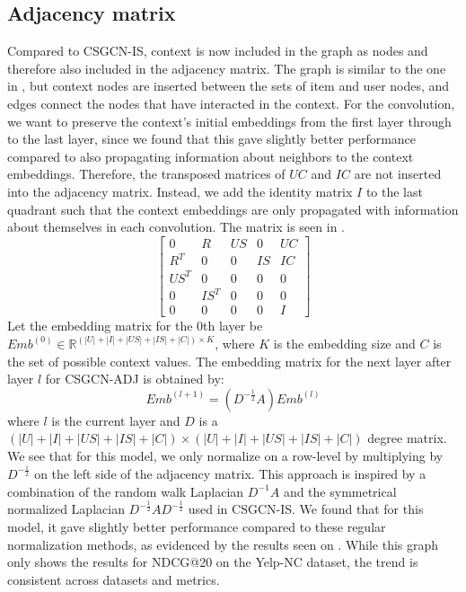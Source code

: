 \subsection{Adjacency matrix}\label{subsec:csgcn_adj_adj_mat}
Compared to CSGCN-IS, context is now included in the graph as nodes and therefore also included in the adjacency matrix.
The graph is similar to the one in , but context nodes are inserted between the sets of item and user nodes, and edges connect the nodes that have interacted in the context.
For the convolution, we want to preserve the context's initial embeddings from the first layer through to the last layer, since we found that this gave slightly better performance compared to also propagating information about neighbors to the context embeddings.
Therefore, the transposed matrices of $UC$ and $IC$ are not inserted into the adjacency matrix.
Instead, we add the identity matrix $I$ to the last quadrant such that the context embeddings are only propagated with information about themselves in each convolution.
The matrix is seen in .
\begin{equation}\label{csgcn_adj_adj_mat}
    \begin{bmatrix}
    0 & R & US & 0 & UC\\
    R^T & 0 & 0 & IS & IC\\
    US^T & 0 & 0 & 0 & 0\\
    0 & IS^T & 0 & 0 & 0 \\
    0 & 0 & 0 & 0 & I
    \end{bmatrix}
\end{equation}
Let the embedding matrix for the 0th layer be $Emb^{(0)} \in \mathbb{R}^{(|U| + |I| + |US| + |IS| + |C|) \times K}$, where $K$ is the embedding size and $C$ is the set of possible context values.
The embedding matrix for the next layer after layer $l$ for CSGCN-ADJ is obtained by:
\begin{equation}
    Emb^{(l+1)} = (D^{-\frac{1}{2}}A)Emb^{(l)}
\end{equation}
where $l$ is the current layer and $D$ is a $(|U| + |I| + |US| + |IS| + |C|) \times (|U| + |I| + |US| + |IS|+ |C|)$ degree matrix. 
We see that for this model, we only normalize on a row-level by multiplying by $D^{-\frac{1}{2}}$ on the left side of the adjacency matrix.
This approach is inspired by a combination of the random walk Laplacian $D^{-1}A$ and the symmetrical normalized Laplacian $D^{-\frac{1}{2}}AD^{-\frac{1}{2}}$ used in CSGCN-IS.
We found that for this model, it gave slightly better performance compared to these regular normalization methods, as evidenced by the results seen on .
While this graph only shows the results for NDCG@20 on the Yelp-NC dataset, the trend is consistent across datasets and metrics.

